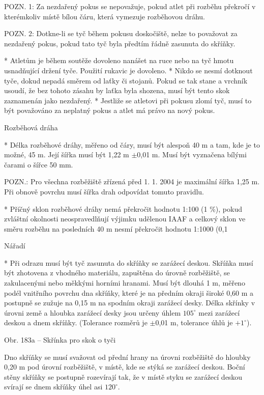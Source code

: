 POZN. 1: Za nezdařený pokus se nepovažuje, pokud atlet při rozběhu překročí v kterémkoliv místě bílou čáru, která vymezuje rozběhovou dráhu.

POZN. 2: Dotkne-li se tyč během pokusu doskočiště, nelze to považovat za nezdařený pokus, pokud tato tyč byla předtím řádně zasunuta do skříňky.

* Atletům je během soutěže dovoleno nanášet na ruce nebo na tyč hmotu usnadňující držení tyče. Použití rukavic je dovoleno.
* Nikdo se nesmí dotknout tyče, dokud nepadá směrem od laťky či stojanů. Pokud se tak stane a vrchník usoudí, že bez tohoto zásahu by laťka byla shozena, musí být tento skok zaznamenán jako nezdařený.
* Jestliže se atletovi při pokusu zlomí tyč, musí to být považováno za neplatný pokus a atlet má právo na nový pokus.

Rozběhová dráha

* Délka rozběhové dráhy, měřeno od  čáry, musí být alespoň 40 m a tam, kde je to možné, 45 m. Její šířka musí být 1,22 m $\pm$0,01 m. Musí být vyznačena bílými čarami o šířce 50 mm.

POZN.: Pro všechna rozběžiště zřízená před 1. 1. 2004 je maximální šířka 1,25 m. Při obnově povrchu musí šířka drah odpovídat tomuto pravidlu.

* Příčný sklon rozběhové dráhy nemá překročit hodnotu 1:100 (1 \%), pokud zvláštní okolnosti neospravedlňují výjimku udělenou IAAF a celkový sklon ve směru rozběhu na posledních 40 m nesmí překročit hodnotu 1:1000 (0,1 %

Nářadí

* Při odrazu musí být tyč zasunuta do skříňky se zarážecí deskou. Skříňka musí být zhotovena z vhodného materiálu, zapuštěna do úrovně rozběžiště, se zakulacenými nebo měkkými horními hranami. Musí být dlouhá 1 m, měřeno podél vnitřního povrchu dna skříňky, které je na předním okraji široké 0,60 m a postupně se zužuje na 0,15 m na spodním okraji zarážecí desky. Délka skřínky v úrovni země a hloubka zarážecí desky jsou určeny úhlem $105^\circ$ mezi zarážecí deskou a dnem skříňky. (Tolerance rozměrů je $\pm$0,01 m, tolerance úhlů je $+1^\circ$).

Obr. 183a -- Skřínka pro skok o tyči

Dno skříňky se musí svažovat od přední hrany na úrovni rozběžiště do hloubky 0,20 m pod úrovní rozběžiště, v místě, kde se stýká se zarážecí deskou. Boční stěny skříňky se postupně rozevírají tak, že v místě styku se zarážecí deskou svírají se dnem skříňky úhel asi $120^\circ$.

